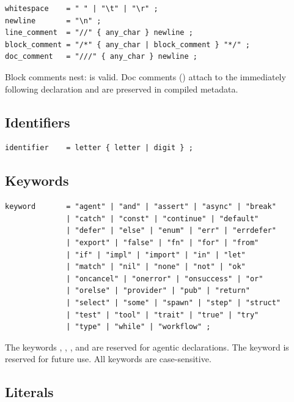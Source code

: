\begin{lstlisting}[language=EBNF]
whitespace    = " " | "\t" | "\r" ;
newline       = "\n" ;
line_comment  = "//" { any_char } newline ;
block_comment = "/*" { any_char | block_comment } "*/" ;
doc_comment   = "///" { any_char } newline ;
\end{lstlisting}

\begin{note}
Block comments nest:  is valid. Doc comments (\code{///}) attach to the immediately following declaration and are preserved in compiled metadata.
\end{note}

\subsection{Identifiers}

\begin{lstlisting}[language=EBNF]
identifier    = letter { letter | digit } ;
\end{lstlisting}

\subsection{Keywords}

\begin{lstlisting}[language=EBNF]
keyword       = "agent" | "and" | "assert" | "async" | "break"
              | "catch" | "const" | "continue" | "default"
              | "defer" | "else" | "enum" | "err" | "errdefer"
              | "export" | "false" | "fn" | "for" | "from"
              | "if" | "impl" | "import" | "in" | "let"
              | "match" | "nil" | "none" | "not" | "ok"
              | "oncancel" | "onerror" | "onsuccess" | "or"
              | "orelse" | "provider" | "pub" | "return"
              | "select" | "some" | "spawn" | "step" | "struct"
              | "test" | "tool" | "trait" | "true" | "try"
              | "type" | "while" | "workflow" ;
\end{lstlisting}

\begin{note}
The keywords , , , and  are reserved for agentic declarations. The keyword  is reserved for future use. All keywords are case-sensitive.
\end{note}

\subsection{Literals}

